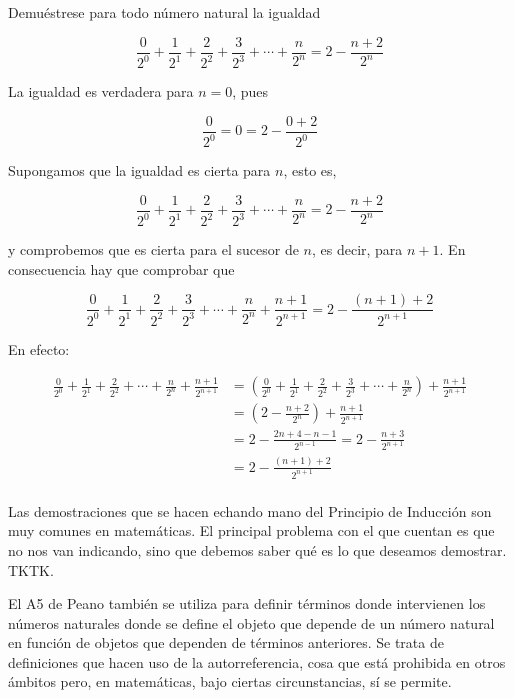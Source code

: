 \begin{example}
  Demuéstrese para todo número natural la igualdad

  \[ \frac{0}{2^0} + \frac{1}{2^1} +  \frac{2}{2^2} +  \frac{3}{2^3} +
  \cdots + \frac{n}{2^n} = 2 - \frac{n + 2}{2^n} \]

  La igualdad es verdadera para $n = 0$, pues

  \[ \frac{0}{2^0} = 0 = 2 - \frac{0 + 2}{2^0} \]

  Supongamos que la igualdad es cierta para $n$, esto es,

  \[ \frac{0}{2^0} + \frac{1}{2^1} +  \frac{2}{2^2} +  \frac{3}{2^3} +
  \cdots + \frac{n}{2^n} = 2 - \frac{n + 2}{2^n} \]

  \noindent y comprobemos que es cierta para el sucesor de $n$, es decir,
  para $n + 1$. En consecuencia hay que comprobar que

  \[ \frac{0}{2^0} + \frac{1}{2^1} +  \frac{2}{2^2} +  \frac{3}{2^3} +
  \cdots + \frac{n}{2^n} + \frac{n+1}{2^{n+1}} = 2 - \frac{(n+1) +
  2}{2^{n+1}} \]

  En efecto:

  \begin{align*}
    \frac{0}{2^0} + \frac{1}{2^1} + \frac{2}{2^2} + \cdots + \frac{n}{2^n} +
      \frac{n+1}{2^{n+1}}
    &= \left( \frac{0}{2^0} + \frac{1}{2^1} +  \frac{2}{2^2} +  \frac{3}{2^3}
      + \cdots + \frac{n}{2^n} \right) + \frac{n+1}{2^{n+1}} \\
    &= \left( 2 - \frac{n+2}{2^n} \right) + \frac{n+1}{2^{n+1}} \\
    &= 2 - \frac{2n + 4 - n - 1}{2^{n-1}} = 2 - \frac{n + 3}{ 2^{n+1}} \\
    &=  2 - \frac{(n+1) + 2}{2^{n+1}} \\
  \end{align*}
\end{example}

Las demostraciones que se hacen echando mano del Principio de Inducción son
muy comunes en matemáticas. El principal problema con el que cuentan es que
no nos van indicando, sino que debemos saber qué es lo que deseamos
demostrar. TKTK.

El A5 de Peano también se utiliza para definir términos donde intervienen
los números naturales donde se define el objeto que depende de un número
natural en función de objetos que dependen de términos anteriores. Se trata
de definiciones que hacen uso de la autorreferencia, cosa que está prohibida
en otros ámbitos\footnotemark{} pero, en matemáticas, bajo ciertas
circunstancias, sí se permite.

